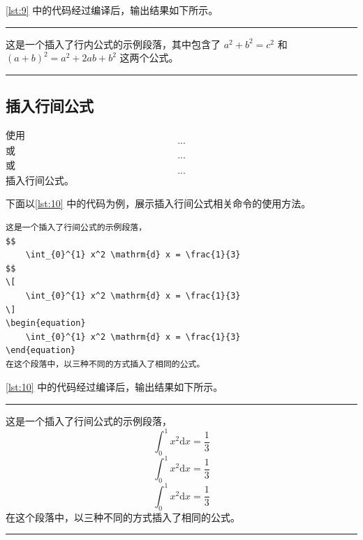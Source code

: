 \documentclass[a4paper]{article}
\begin{document}
\cref{lst:9} 中的代码经过编译后，输出结果如下所示。

\vspace{0.75cm}
\hrule
\vspace{0.25cm}

这是一个插入了行内公式的示例段落，其中包含了 $a^2 + b^2 = c^2$ 和  \((a+b)^2 = a^2 + 2ab + b^2\) 这两个公式。

\vspace{0.25cm}
\hrule
\vspace{0.25cm}

\subsection{插入行间公式}

使用 \texttt{$$...$$} 或 \texttt{\[...\]} 或 \texttt{\begin{equation}...\end{equation}} 插入行间公式。

下面以\cref{lst:10} 中的代码为例，展示插入行间公式相关命令的使用方法。

\begin{center}
    \label{lst:10}
    \begin{verbatim}
这是一个插入了行间公式的示例段落，
$$
    \int_{0}^{1} x^2 \mathrm{d} x = \frac{1}{3}
$$
\[
    \int_{0}^{1} x^2 \mathrm{d} x = \frac{1}{3}
\]
\begin{equation}
    \int_{0}^{1} x^2 \mathrm{d} x = \frac{1}{3}
\end{equation}
在这个段落中，以三种不同的方式插入了相同的公式。
    \end{verbatim}
\end{center}

\cref{lst:10} 中的代码经过编译后，输出结果如下所示。

\vspace{0.75cm}
\hrule
\vspace{0.25cm}

这是一个插入了行间公式的示例段落，
$$
    \int_{0}^{1} x^2 \mathrm{d} x = \frac{1}{3}
$$
\[
    \int_{0}^{1} x^2 \mathrm{d} x = \frac{1}{3}
\]
\begin{equation}
    \int_{0}^{1} x^2 \mathrm{d} x = \frac{1}{3}
\end{equation}
在这个段落中，以三种不同的方式插入了相同的公式。

\vspace{0.25cm}
\hrule
\vspace{0.25cm}
\end{document}
